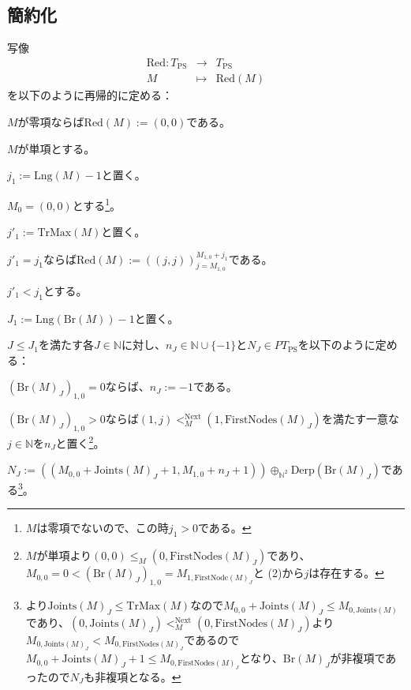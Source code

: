 \documentclass[dvipdfmx,uplatex]{jsarticle}
\theoremstyle{customnonumberbreakfortheorem}
\theoremstyle{customnonumberbreakforproof}
\begin{document}
\subsection{簡約化}

写像
\begin{eqnarray*}
\textrm{Red} \colon T_{\textrm{PS}} & \to & T_{\textrm{PS}} \\
M & \mapsto & \textrm{Red}(M)
\end{eqnarray*}
を以下のように再帰的に定める：
\begin{nenumerate}
	\item \(M\)が零項ならば\(\textrm{Red}(M) := (0,0)\)である。
	\item \(M\)が単項とする。
	\begin{nenumerate}
		\item \(j_1 := \textrm{Lng}(M) - 1\)と置く。
		\item \(M_0 = (0,0)\)とする\footnote{\(M\)は零項でないので、この時\(j_1 > 0\)である。}。
		\begin{nenumerate}
			\item \(j'_1 := \textrm{TrMax}(M)\)と置く。
			\item \(j'_1 = j_1\)ならば\(\textrm{Red}(M) := ((j,j))_{j=M_{1,0}}^{M_{1,0}+j_1}\)である。
			\item \(j'_1 < j_1\)とする。
			\item \(J_1 := \textrm{Lng}(\textrm{Br}(M)) - 1\)と置く。
			\item \(J \leq J_1\)を満たす各\(J \in \mathbb{N}\)に対し、\(n_J \in \mathbb{N} \cup \{-1\}\)と\(N_J \in PT_{\textrm{PS}}\)を以下のように定める：
			\begin{nenumerate}
				\item \((\textrm{Br}(M)_J)_{1,0} = 0\)ならば、\(n_J := -1\)である。
				\item \((\textrm{Br}(M)_J)_{1,0} > 0\)ならば\((1,j) <_M^{\textrm{Next}} (1,\textrm{FirstNodes}(M)_J)\)を満たす一意な\(j \in \mathbb{N}\)を\(n_J\)と置く\footnote{\(M\)が単項より\((0,0) \leq_M (0,\textrm{FirstNodes}(M)_J)\)であり、\(M_{0,0} = 0 < (\textrm{Br}(M)_J)_{1,0} = M_{1,\textrm{FirstNode}(M)_J}\)と (2)から\(j\)は存在する。}。
				\item \(N_J := ((M_{0,0} + \textrm{Joints}(M)_J + 1,M_{1,0} + n_J + 1)) \oplus_{\mathbb{N}^2} \textrm{Derp}(\textrm{Br}(M)_J)\)である\footnote{より\(\textrm{Joints}(M)_J \leq \textrm{TrMax}(M)\)なので\(M_{0,0} + \textrm{Joints}(M)_J \leq M_{0,\textrm{Joints}(M)}\)であり、\((0,\textrm{Joints}(M)_J) <_M^{\textrm{Next}} (0,\textrm{FirstNodes}(M)_J)\)より\(M_{0,\textrm{Joints}(M)_J} < M_{0,\textrm{FirstNodes}(M)_J}\)であるので\(M_{0,0} + \textrm{Joints}(M)_J + 1 \leq M_{0,\textrm{FirstNodes}(M)_J}\)となり、\(\textrm{Br}(M)_J\)が非複項であったので\(N_J\)も非複項となる。}。

\end{nenumerate}
\end{nenumerate}
\end{nenumerate}
\end{nenumerate}
\end{document}
